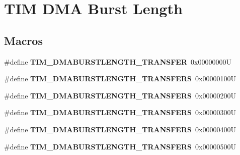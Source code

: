 \hypertarget{group___t_i_m___d_m_a___burst___length}{}\section{T\+IM D\+MA Burst Length}
\label{group___t_i_m___d_m_a___burst___length}
\subsection*{Macros}
\begin{DoxyCompactItemize}
\item 
\mbox{\label{group___t_i_m___d_m_a___burst___length_ga74f07b4a10022d71f31ec6e1b2b69276}} 
\#define {\bfseries T\+I\+M\+\_\+\+D\+M\+A\+B\+U\+R\+S\+T\+L\+E\+N\+G\+T\+H\+\_\+T\+R\+A\+N\+S\+F\+ER}~0x00000000U
\item 
\mbox{\label{group___t_i_m___d_m_a___burst___length_gab114592091a00e0a6b9ae464485bd7bb}} 
\#define {\bfseries T\+I\+M\+\_\+\+D\+M\+A\+B\+U\+R\+S\+T\+L\+E\+N\+G\+T\+H\+\_\+T\+R\+A\+N\+S\+F\+E\+RS}~0x00000100U
\item 
\mbox{\label{group___t_i_m___d_m_a___burst___length_gad91c14f0930803593ecdbd98002fea0a}} 
\#define {\bfseries T\+I\+M\+\_\+\+D\+M\+A\+B\+U\+R\+S\+T\+L\+E\+N\+G\+T\+H\+\_\+T\+R\+A\+N\+S\+F\+E\+RS}~0x00000200U
\item 
\mbox{\label{group___t_i_m___d_m_a___burst___length_ga9ada9605ae6ff6e4ada9701263bef812}} 
\#define {\bfseries T\+I\+M\+\_\+\+D\+M\+A\+B\+U\+R\+S\+T\+L\+E\+N\+G\+T\+H\+\_\+T\+R\+A\+N\+S\+F\+E\+RS}~0x00000300U
\item 
\mbox{\label{group___t_i_m___d_m_a___burst___length_ga740a6446c0a517cc3e235fddee45fef5}} 
\#define {\bfseries T\+I\+M\+\_\+\+D\+M\+A\+B\+U\+R\+S\+T\+L\+E\+N\+G\+T\+H\+\_\+T\+R\+A\+N\+S\+F\+E\+RS}~0x00000400U
\item 
\mbox{\label{group___t_i_m___d_m_a___burst___length_ga905c206d2a028e3fb92bcab8f9f7c869}} 
\#define {\bfseries T\+I\+M\+\_\+\+D\+M\+A\+B\+U\+R\+S\+T\+L\+E\+N\+G\+T\+H\+\_\+T\+R\+A\+N\+S\+F\+E\+RS}~0x00000500U

\end{DoxyCompactItemize}
